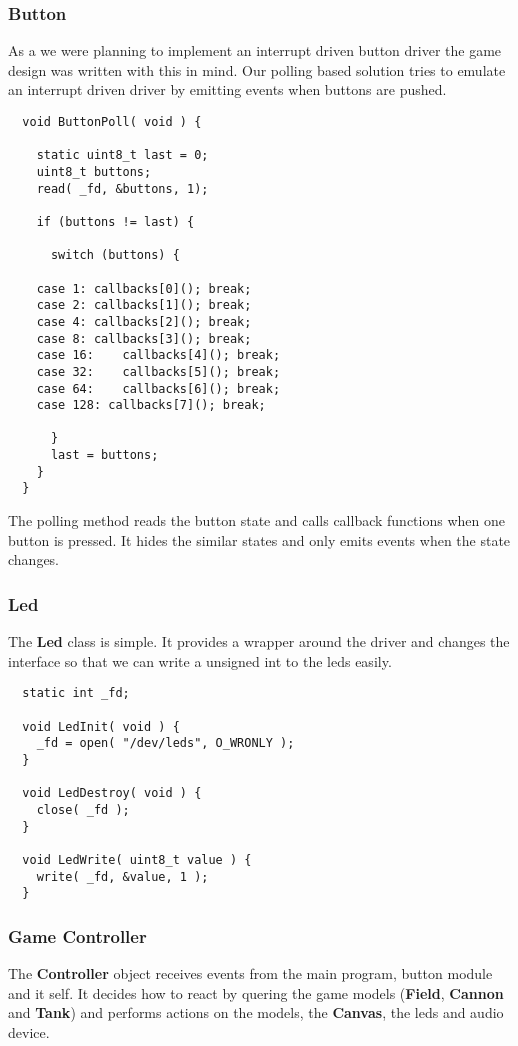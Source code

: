 \subsubsection{Button}
As a we were planning to implement an interrupt driven button driver the game design
was written with this in mind. Our polling based solution tries to emulate an interrupt
driven driver by emitting events when buttons are pushed.

\begin{lstlisting}
  void ButtonPoll( void ) {

    static uint8_t last = 0;
    uint8_t buttons;
    read( _fd, &buttons, 1);

    if (buttons != last) {

      switch (buttons) {

	case 1:	callbacks[0](); break;
	case 2:	callbacks[1](); break;
	case 4:	callbacks[2](); break;
	case 8:	callbacks[3](); break;
	case 16:	callbacks[4](); break;
	case 32:	callbacks[5](); break;
	case 64:	callbacks[6](); break;
	case 128: callbacks[7](); break;

      }
      last = buttons;
    }
  }
\end{lstlisting}
The polling method reads the button state and calls callback functions when one button
is pressed. It hides the similar states and only emits events when the state changes.

\subsubsection{Led}
The {\bf Led} class is simple. It provides a wrapper around the driver and changes the interface
so that we can write a unsigned int to the leds easily.
\begin{lstlisting}
  static int _fd;

  void LedInit( void ) {
    _fd = open( "/dev/leds", O_WRONLY );
  }

  void LedDestroy( void ) {
    close( _fd );
  }

  void LedWrite( uint8_t value ) {
    write( _fd, &value, 1 );
  }
\end{lstlisting}


\subsubsection{Game Controller}
The {\bf Controller} object receives events from the main program, button module and it self.
It decides how to react by quering the game models ({\bf Field}, {\bf Cannon} and {\bf Tank})
and performs actions on the models, the {\bf Canvas}, the leds and audio device.


